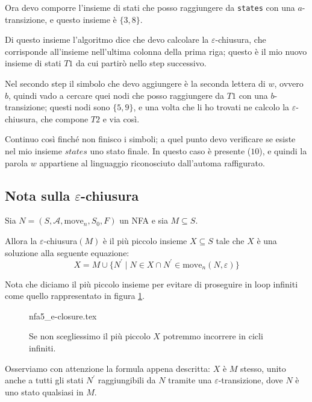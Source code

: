 \documentclass[class=book, crop=false, oneside, 12pt]{standalone}
\begin{document}
Ora devo comporre l’insieme di stati che posso raggiungere da \texttt{states} con una \(a\)-transizione, e questo insieme è \(\{3, 8\}\). 

Di questo insieme l’algoritmo dice che devo calcolare la \(\varepsilon\)-chiusura, che corrisponde all’insieme nell’ultima colonna della prima riga; questo è il mio nuovo insieme di stati \(T1\) da cui partirò nello step successivo.

Nel secondo step il simbolo che devo aggiungere è la seconda lettera di \(w\), ovvero \(b\), quindi vado a cercare quei nodi che posso raggiungere da \(T1\) con una \(b\)-transizione; questi nodi sono \(\{5,9\}\), e una volta che li ho trovati ne calcolo la \(\varepsilon\)-chiusura, che compone \(T2\) e via così.

Continuo così finché non finisco i simboli; a quel punto devo verificare se esiste nel mio insieme \(states\) uno stato finale. In questo caso è presente (\(10\)), e quindi la parola \(w\) appartiene al linguaggio riconosciuto dall’automa raffigurato.

\subsection{Nota sulla \texorpdfstring{$\varepsilon$}{Epsilon}-chiusura}
\begin{theorem}
    Sia \(N = (S, \mathcal{A}, \textrm{move}_n, S_0, F)\) un NFA e sia \(M \subseteq S\).
    
    Allora la \(\varepsilon\)-chiusura\((M)\) è il più piccolo insieme \(X \subseteq S\) tale che \(X\) è una soluzione alla seguente equazione:
    \begin{equation}
        X = M \cup \{ N^\prime \mid N \in X \cap N^\prime \in \textrm{move}_n (N,\varepsilon)\}
        \label{eps-closure-set-eq}
    \end{equation}
\end{theorem}

\noindent Nota che diciamo il più piccolo insieme per evitare di proseguire in loop infiniti come quello rappresentato in figura \ref{nfa_ciclico}.

\begin{figure}
    \centering
    {nfa5_e-closure.tex}
    \caption{Se non scegliessimo il più piccolo \(X\) potremmo incorrere in cicli infiniti.}
    \label{nfa_ciclico}
\end{figure}

Osserviamo con attenzione la formula appena descritta: \(X\) è \(M\) stesso, unito anche a tutti gli stati \(N^\prime \) raggiungibili da \(N\) tramite una \(\varepsilon\)-transizione, dove \(N\) è uno stato qualsiasi in \(M\).
\end{document}
